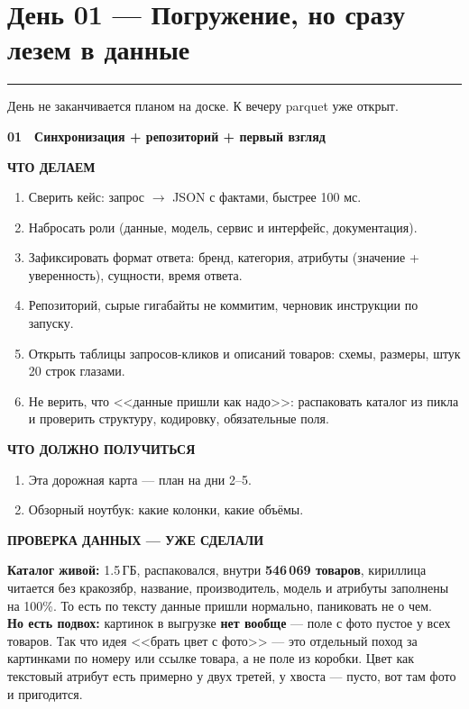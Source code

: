 \documentclass[11pt,a4paper]{article}
\newcommand{\secrule}{%
  \par\vspace{4pt}%
  {\color{mvred}\noindent\rule{\linewidth}{0.9pt}\par}%
  \vspace{8pt}%
}
\newcommand{\daysection}[1]{%
  \Needspace{22\baselineskip}%
  \section{#1}\secrule
}
\newcommand{\dayblock}[4]{%
  \begin{tcolorbox}[
    enhanced,
    colback=white,
    colframe=rulec,
    boxrule=0.65pt,
    arc=2pt,
    left=8pt,
    right=8pt,
    top=8pt,
    bottom=8pt,
    before skip=3pt,
    after skip=11pt,
  ]
  {\color{mvred}\bfseries #1}~~{\bfseries #2}\par\vspace{4pt}%
  {\scriptsize\bfseries\color{inksoft}ЧТО ДЕЛАЕМ}\par\vspace{1pt}%
  #3\par\vspace{5pt}%
  {\scriptsize\bfseries\color{mint}ЧТО ДОЛЖНО ПОЛУЧИТЬСЯ}\par\vspace{1pt}%
  #4%
  \end{tcolorbox}%
}
\begin{document}
\daysection{День 01 --- Погружение, но сразу лезем в данные}
День не заканчивается планом на доске. К вечеру parquet уже открыт.

\dayblock{01}{Синхронизация + репозиторий + первый взгляд}{%
\begin{enumerate}
  \item Сверить кейс: запрос $\to$ JSON с фактами, быстрее 100 мс.
  \item Набросать роли (данные, модель, сервис и интерфейс, документация).
  \item Зафиксировать формат ответа: бренд, категория, атрибуты (значение + уверенность), сущности, время ответа.
  \item Репозиторий, сырые гигабайты не коммитим, черновик инструкции по запуску.
  \item Открыть таблицы запросов-кликов и описаний товаров: схемы, размеры, штук 20 строк глазами.
  \item Не верить, что <<данные пришли как надо>>: распаковать каталог из пикла и проверить структуру, кодировку, обязательные поля.
\end{enumerate}
}{%
\begin{enumerate}
  \item Эта дорожная карта --- план на дни 2--5.
  \item Обзорный ноутбук: какие колонки, какие объёмы.
\end{enumerate}
}

\begin{center}
\begin{tcolorbox}[colback=sand!35, colframe=mint, boxrule=0.7pt, width=0.93\textwidth, arc=2pt, before skip=2pt, after skip=10pt]
{\scriptsize\bfseries\color{mint}ПРОВЕРКА ДАННЫХ --- УЖЕ СДЕЛАЛИ}\par\vspace{2pt}
\textbf{Каталог живой:} 1.5\,ГБ, распаковался, внутри \textbf{546\,069 товаров}, кириллица читается без кракозябр, название, производитель, модель и атрибуты заполнены на 100\%. То есть по тексту данные пришли нормально, паниковать не о чем.\\[4pt]
\textbf{Но есть подвох:} картинок в выгрузке \textbf{нет вообще} --- поле с фото пустое у всех товаров. Так что идея <<брать цвет с фото>> --- это отдельный поход за картинками по номеру или ссылке товара, а не поле из коробки. Цвет как текстовый атрибут есть примерно у двух третей, у хвоста --- пусто, вот там фото и пригодится.
\end{tcolorbox}
\end{center}
\end{document}

